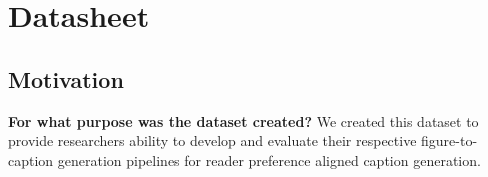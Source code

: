 \documentclass[11pt]{article}
\begin{document}

\section{Datasheet}

\subsection{Motivation}
\textbf{For what purpose was the dataset created?} We created this dataset to provide researchers ability to develop and evaluate their respective figure-to-caption generation pipelines for reader preference aligned caption generation.
\end{document}
